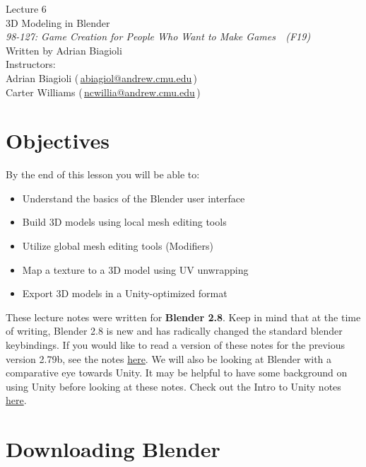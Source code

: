\documentclass[11pt]{article}
\makeatletter
\newcommand{\lecturenum}{6}
\newcommand{\lecturename}{3D Modeling in Blender}
\newcommand{\authorname}{Adrian Biagioli}
\newcommand{\coursenum}{98-127}
\newcommand{\coursename}{Game Creation for People Who Want to Make Games}
\newcommand{\coursesem}{F19}
\newcommand{\instructors}{Adrian Biagioli (\,\href{mailto:abiagiol@andrew.cmu.edu}{abiagiol@andrew.cmu.edu}\,) \\ Carter Williams (\,\href{mailto:ncwillia@andrew.cmu.edu}{ncwillia@andrew.cmu.edu}\,)}
\makeatother
\begin{document}
\thispagestyle{plain}
{
    \vspace{1.5em}
    \begin{center}
    {
        \huge
        Lecture \lecturenum \\
        \vspace{0.5em}
        \lecturename
        \vspace{0.4em}
    } \\
    {
        \it
        \coursenum: \coursename\ \ (\coursesem)
    } \\
    \vspace{1.0em}
    Written by \authorname \\
    \vspace{0.7em}
    Instructors:\\ \instructors
    \end{center}
}

\section{Objectives}

By the end of this lesson you will be able to:
\begin{itemize}
    \item Understand the basics of the Blender user interface
    \item Build 3D models using local mesh editing tools
    \item Utilize global mesh editing tools (Modifiers)
    \item Map a texture to a 3D model using UV unwrapping
    \item Export 3D models in a Unity-optimized format
\end{itemize}

\noindent These lecture notes were written for {\bf Blender 2.8}.  Keep in mind that at the time 
of writing, Blender 2.8 is new and has radically changed the standard blender keybindings. If you
would like to read a version of these notes for the previous version 2.79b, see the notes
\href{http://stage.gamecreation.org/StuCo/lectures/lec06_blender279.pdf}{here}.  We will also
be looking at Blender with a comparative eye towards Unity.  It may be helpful to have
some background on using Unity before looking at these notes.  Check out the Intro to Unity notes
\href{http://stage.gamecreation.org/StuCo/lectures/lec02.pdf}{here}.

\section{Downloading Blender}
\end{document}
